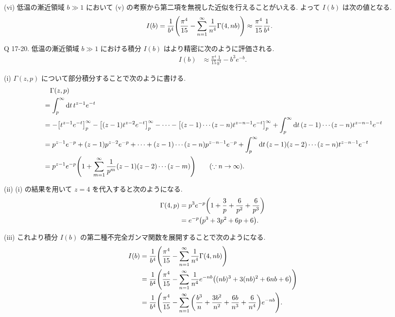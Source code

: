 \documentclass[uplatex,dvipdfmx,a4paper,11pt]{jlreq}
\theoremstyle{definition}
\begin{document}
(vi) 低温の漸近領域 $b\gg 1$ において (v) の考察から第二項を無視した近似を行えることがいえる. よって $I(b)$ は次の値となる.
\begin{align}
  I(b) & = \frac{1}{b^4}\qty(\frac{\pi^4}{15} - \sum_{n=1}^{\infty}\frac{1}{n^4}\Gamma(4, nb)) \approx \frac{\pi^4}{15}\frac{1}{b^4}.
\end{align}

\begin{itembox}[l]{Q 17-20.}
  低温の漸近領域 $b\gg 1$ における積分 $I(b)$ はより精密に次のように評価される.
  \begin{align}
    I(b) & \approx \frac{\pi^4}{15}\frac{1}{b^4} - b^3e^{-b}.
  \end{align}
\end{itembox}

(i)
$\Gamma(z, p)$ について部分積分することで次のように書ける.
\begin{align}
   & \quad \Gamma(z, p)                                                                                                                                                                  \\
   & = \int_p^\infty\dd{t}t^{z-1}e^{-t}                                                                                                                                                  \\
   & = -\qty[t^{z-1}e^{-t}]_p^\infty - \qty[(z-1)t^{z-2}e^{-t}]_p^\infty - \cdots - \qty[(z-1)\cdots(z-n)t^{z-n-1}e^{-t}]_p^\infty + \int_p^\infty\dd{t} (z-1)\cdots(z-n)t^{z-n-1}e^{-t} \\
   & = p^{z-1}e^{-p} + (z-1)p^{z-2}e^{-p} + \cdots + (z-1)\cdots(z-n)p^{z-n-1}e^{-p} + \int_p^\infty\dd{t} (z-1)(z-2)\cdots(z-n)t^{z-n-1}e^{-t}                                          \\
   & = p^{z-1}e^{-p}\qty(1 + \sum_{m=1}^{\infty}\frac{1}{p^m}(z-1)(z-2)\cdots(z-m)) \qquad (\because n\to\infty).
\end{align}

(ii)
(i) の結果を用いて $z = 4$ を代入すると次のようになる.
\begin{align}
  \Gamma(4, p) & = p^{3}e^{-p}\qty(1 + \frac{3}{p} + \frac{6}{p^2} + \frac{6}{p^3}) \\
               & = e^{-p}\qty(p^3 + 3p^2 + 6p + 6).
\end{align}

(iii)
これより積分 $I(b)$ の第二種不完全ガンマ関数を展開することで次のようになる.
\begin{align}
  I(b) & = \frac{1}{b^4}\qty(\frac{\pi^4}{15} - \sum_{n=1}^{\infty}\frac{1}{n^4}\Gamma(4, nb))                                                      \\
       & = \frac{1}{b^4}\qty(\frac{\pi^4}{15} - \sum_{n=1}^{\infty}\frac{1}{n^4}e^{-nb}\qty((nb)^3 + 3(nb)^2 + 6nb + 6))                            \\
       & = \frac{1}{b^4}\qty(\frac{\pi^4}{15} - \sum_{n=1}^{\infty}\qty(\frac{b^3}{n} + \frac{3b^2}{n^2} + \frac{6b}{n^3} + \frac{6}{n^4})e^{-nb}).
\end{align}
\end{document}
